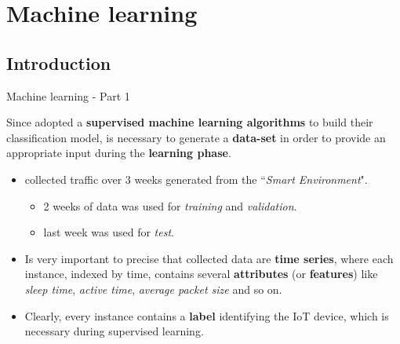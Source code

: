 \documentclass[10pt]{beamer}
\begin{document}
\section{Machine learning}
\subsection{Introduction}
\begin{frame}{Machine learning - Part 1}

\begin{block}{}
\justifying
Since \citet{ITPAReport} adopted a \textbf{supervised machine learning algorithms} to build their classification model, is necessary to generate a \textbf{data-set} in order to provide an appropriate input during the \textbf{learning phase}.
\end{block}

\begin{itemize}
\justifying
\item \citet{ITPAReport} collected traffic over $3$ weeks generated from the ``\textit{Smart Environment}".
\begin{itemize}
\item 2 weeks of data was used for \textit{training} and \textit{validation}.
\item last week was used for \textit{test}.
\end{itemize}

\item Is very important to precise that collected data are \textbf{time series}, where each instance, indexed by time, contains several \textbf{attributes} (or \textbf{features}) like \textit{sleep time}, \textit{active time}, \textit{average packet size} and so on.

\item Clearly, every instance contains a \textbf{label} identifying the IoT device, which is necessary during supervised learning.
\end{itemize}

\end{frame} 
\end{document}
